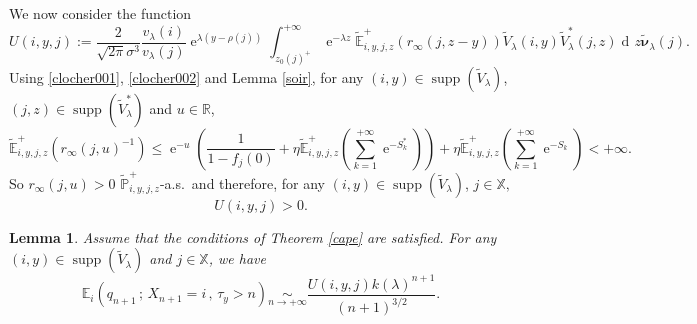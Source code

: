 \documentclass[12pt]{amsart}
\newtheorem{lemma}[theorem]{Lemma}
\theoremstyle{definition}
\numberwithin{equation}{section}
\def\bb#1{\mathbb{#1}}
\def\tt#1{\tilde{#1}}
\def\tbs#1{\tilde{\boldsymbol{#1}}}
\def\tbb#1{\tilde{\mathbb{#1}}}
\def\leq{\leqslant}
\renewcommand\ll{\lambda}
\DeclareMathOperator{\dd}{d\!}
\DeclareMathOperator{\e}{e}
\DeclareMathOperator{\supp}{supp}
\begin{document}
We now consider the function
\[
U(i,y,j) := \frac{2}{\sqrt{2\pi} \sigma^3} \frac{v_{\ll}(i)}{v_{\ll}(j)} \e^{\ll (y-\rho(j))} \int_{z_0(j)^+}^{+\infty} \e^{-\ll z} \tbb E_{i,y,j,z}^+ \left( r_{\infty} (j,z-y) \right) \tt V_{\ll} (i,y) \tt V_{\ll}^* (j,z) \dd z \tbs \nu_{\ll}(j).
\]
Using \eqref{clocher001}, \eqref{clocher002} and Lemma \ref{soir}, for any $(i,y) \in \supp \left( \tt V_{\ll} \right)$, $(j,z) \in \supp \left( \tt V_{\ll}^* \right)$ and $u \in \bb R$,
\[
\tbb E_{i,y,j,z}^+ \left( r_{\infty} (j,u)^{-1} \right) \leq \e^{-u} \left( \frac{1}{1-f_j(0)} + \eta \tbb E_{i,y,j,z}^+ \left( \sum_{k=1}^{+\infty} \e^{-S_k^*} \right) \right) + \eta \tbb E_{i,y,j,z}^+ \left( \sum_{k=1}^{+\infty} \e^{-S_k} \right) < +\infty.
\]
So $r_{\infty} (j,u) > 0$ $\tbb P_{i,y,j,z}^+$-a.s.\ and therefore, for any $(i,y) \in \supp \left( \tt V_{\ll} \right)$, $j \in \bb X,$
\begin{equation}
\label{canopee}
U(i,y,j) > 0.
\end{equation}

\begin{lemma} Assume that the conditions of Theorem \ref{cape} are satisfied.
\label{chaumiere}
For any $(i,y) \in \supp \left( \tt V_{\ll} \right)$ and $j \in \bb X$, we have
\[
\bb E_i \left( q_{n+1} \,;\, X_{n+1} = i \,,\, \tau_y > n \right) \underset{n\to+\infty}{\sim} \frac{U(i,y,j) k(\ll)^{n+1}}{(n+1)^{3/2}}.
\]
\end{lemma}
\end{document}
